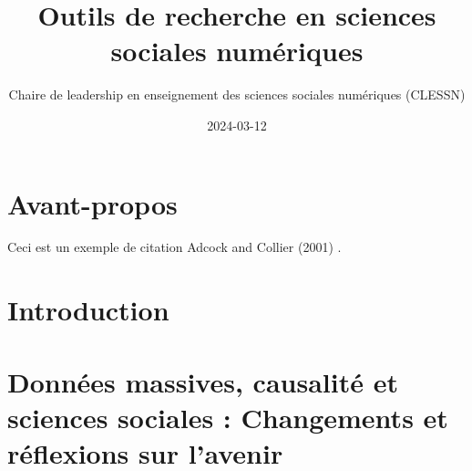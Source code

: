 \documentclass[
  letterpaper,
]{scrbook}
\title{Outils de recherche en sciences sociales numériques}
\author{Chaire de leadership en enseignement des sciences sociales
numériques (CLESSN)}
\date{2024-03-12}
\renewcommand*\contentsname{Table of contents}
\newcommand\contentsname{Table of contents}
\begin{document}
\frontmatter
\maketitle
\ifdefined\Shaded\renewenvironment{Shaded}{\begin{tcolorbox}[boxrule=0pt, enhanced, frame hidden, interior hidden, borderline west={3pt}{0pt}{shadecolor}, breakable, sharp corners]}{\end{tcolorbox}}\fi

\renewcommand*\contentsname{Table of contents}
{
\setcounter{tocdepth}{2}
\tableofcontents
}
\mainmatter
{}

\hypertarget{avant-propos}{%
\chapter*{Avant-propos}\label{avant-propos}}


Ceci est un exemple de citation Adcock and Collier (2001) .


\hypertarget{introduction}{%
\chapter*{Introduction}\label{introduction}}



\hypertarget{donnuxe9es-massives-causalituxe9-et-sciences-sociales-changements-et-ruxe9flexions-sur-lavenir}{%
\chapter{Données massives, causalité et sciences sociales : Changements
et réflexions sur
l'avenir}\label{donnuxe9es-massives-causalituxe9-et-sciences-sociales-changements-et-ruxe9flexions-sur-lavenir}}
\end{document}

